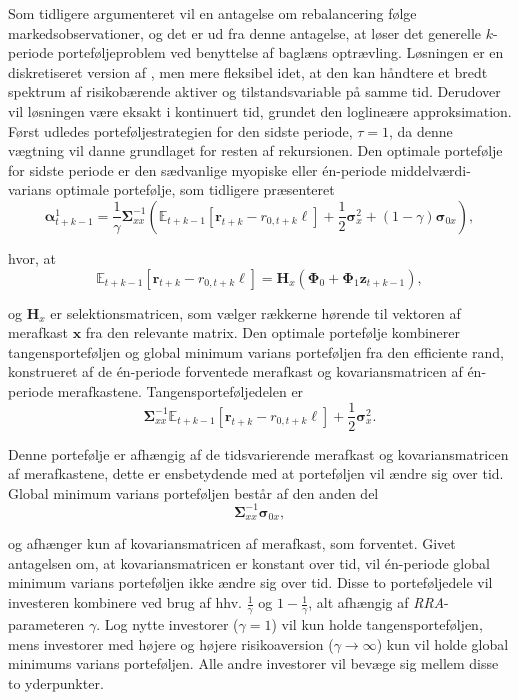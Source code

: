 \documentclass[
  a4paper,
  oneside]{memoir}
\begin{document}
Som tidligere argumenteret vil en antagelse om rebalancering følge markedsobservationer, og det er ud fra denne antagelse, at \citep{JurVic2011} løser det generelle \(k\)-periode porteføljeproblem ved benyttelse af baglæns optrævling. Løsningen er en diskretiseret version af \citep{Liu2007}, men mere fleksibel idet, at den kan håndtere et bredt spektrum af risikobærende aktiver og tilstandsvariable på samme tid. Derudover vil løsningen være eksakt i kontinuert tid, grundet den loglineære approksimation. Først udledes porteføljestrategien for den sidste periode, \(\tau=1\), da denne vægtning vil danne grundlaget for resten af rekursionen. Den optimale portefølje for sidste periode er den sædvanlige myopiske eller én-periode middelværdi-varians optimale portefølje, som tidligere præsenteret
\[\bm{\alpha}_{t+k-1}^1=\frac{1}{\gamma}\bm{\Sigma}_{xx}^{-1}\left(\mathbb{E}_{t+k-1}\left[\bm{r}_{t+k}-r_{0,t+k}\bm{\ell}\right]+\frac{1}{2}\bm{\sigma}_x^2 + (1-\gamma) \bm{\sigma}_{0x}\right),\]

hvor, at
\[\mathbb{E}_{t+k-1}\left[\bm{r}_{t+k}-r_{0,t+k}\bm{\ell}\right]=\bm{H}_x(\bm{\Phi}_0 + \bm{\Phi}_1 \bm{z}_{t+k-1}),\]

og \(\bm{H}_x\) er selektionsmatricen, som vælger rækkerne hørende til vektoren af merafkast \(\bm{x}\) fra den relevante matrix. Den optimale portefølje kombinerer tangensporteføljen og global minimum varians porteføljen fra den efficiente rand, konstrueret af de én-periode forventede merafkast og kovariansmatricen af én-periode merafkastene. Tangensporteføljedelen er
\[\bm{\Sigma}_{xx}^{-1}\mathbb{E}_{t+k-1}\left[\bm{r}_{t+k}-r_{0,t+k}\bm{\ell}\right]+\frac{1}{2}\bm{\sigma}_x^2.\]

Denne portefølje er afhængig af de tidsvarierende merafkast og kovariansmatricen af merafkastene, dette er ensbetydende med at porteføljen vil ændre sig over tid. Global minimum varians porteføljen består af den anden del
\[\bm{\Sigma}_{xx}^{-1}\bm{\sigma}_{0x},\]

og afhænger kun af kovariansmatricen af merafkast, som forventet. Givet antagelsen om, at kovariansmatricen er konstant over tid, vil én-periode global minimum varians porteføljen ikke ændre sig over tid. Disse to porteføljedele vil investeren kombinere ved brug af hhv. \(\tfrac{1}{\gamma}\) og \(1-\tfrac{1}{\gamma}\), alt afhængig af \emph{RRA}-parameteren \(\gamma\). Log nytte investorer (\(\gamma=1\)) vil kun holde tangensporteføljen, mens investorer med højere og højere risikoaversion (\(\gamma\to\infty\)) kun vil holde global minimums varians porteføljen. Alle andre investorer vil bevæge sig mellem disse to yderpunkter.
\end{document}
